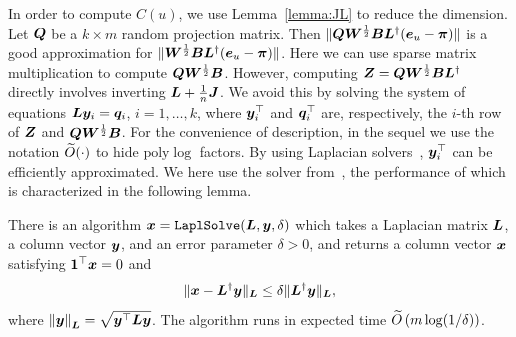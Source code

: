 \documentclass[journal]{IEEEtran}
\begin{document}
In order to compute  \(C(u)\), we use Lemma~\ref{lemma:JL} to reduce the dimension. Let \(\boldsymbol{Q}\) be a \(k\times m\) random projection matrix. Then  \(\|\boldsymbol{Q} \boldsymbol{W}^{\frac{1}{2}} \boldsymbol{B} \boldsymbol{L}^{\dagger}(\boldsymbol{e}_u-\boldsymbol{\pi})\|\) is a good approximation for \(\|\boldsymbol{W}^{\frac{1}{2}} \boldsymbol{B} \boldsymbol{L}^{\dagger} (\boldsymbol{e}_u - \boldsymbol{\pi})\|\). Here we can use sparse matrix multiplication to compute \(\boldsymbol{Q} \boldsymbol{W}^{\frac{1}{2}} \boldsymbol{B}\). However, computing \(\boldsymbol{Z}=\boldsymbol{Q} \boldsymbol{W}^{\frac{1}{2}} \boldsymbol{B} \boldsymbol{L}^{\dagger}\) directly involves inverting \(\boldsymbol{L}+\frac{1}{n}\boldsymbol{J}\). We avoid this by solving the system of equations \(\boldsymbol{L} \boldsymbol{y}_i=\boldsymbol{q}_i\), \(i=1,\ldots,k\), where  \(\boldsymbol{y}^\top_i\) and \(\boldsymbol{q}^\top_i\) are, respectively, the \(i\)-th row of \(\boldsymbol{Z}\) and \(\boldsymbol{Q} \boldsymbol{W}^{\frac{1}{2}} \boldsymbol{B}\). For the convenience  of description, in the sequel we use the notation \(\widetilde{O}(\cdot)\) to hide \(\mathrm{poly} \log \) factors. By using Laplacian solvers~\cite{SpTe04,Sp10,KoMiPe11,LiBr12,CoKyMiPaPeRaSu14,KySa16}, \(\boldsymbol{y}^\top _i\) can be efficiently approximated.  We here use the  solver from~\cite{CoKyMiPaPeRaSu14}, the performance of which is characterized in the following lemma.


\begin{lemma}%
    \label{lemma:ST}
    There is an algorithm \(\boldsymbol{x} = \mathtt{LaplSolve}(\boldsymbol{L},\boldsymbol{y},\delta)\) which
    takes a Laplacian matrix \(\boldsymbol{L}\),
    a column vector \(\boldsymbol{y}\), and an error
    parameter \(\delta > 0\), and returns a column vector \(\boldsymbol{x}\) satisfying  \(\boldsymbol{1}^\top\boldsymbol{x} = 0\) and
    \[
        \|\boldsymbol{x} - \boldsymbol{L}^{\dagger} \boldsymbol{y}\|_{\boldsymbol{L}} \leq \delta \|\boldsymbol{L}^{\dagger} \boldsymbol{y}\|_{\boldsymbol{L}},
    \]
    where \(\left\Vert\boldsymbol{y}\right\Vert_{\boldsymbol{L}} = \sqrt{\boldsymbol{y}^{\top} \boldsymbol{L} \boldsymbol{y}}\).
    The algorithm runs in expected time \(\widetilde{O} \left(m \log(1/\delta) \right)\).
\end{lemma}
\end{document}

